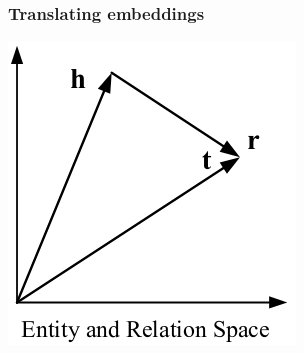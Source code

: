 \documentclass{beamer}
\begin{document}
\begin{frame}
  \frametitle{Translating embeddings}
  \centerline{\includegraphics[width=.7\textwidth]{transe-figure.png}}
\end{frame}
\end{document}
